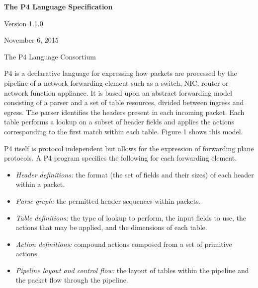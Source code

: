 \documentclass[12pt]{article}
\begin{document}
\vspace{2cm}

\centerline{\sffamily\bfseries\huge The P4 Language Specification}
\vspace{3mm}
\centerline{\sffamily\Large Version 1.1.0}
\vspace{3mm}
\centerline{\sffamily\large November 6, 2015}
\vspace{8mm}
\centerline{\sffamily\large The P4 Language Consortium}

\date{November 6, 2015}
\thispagestyle{firstpagestyle}


P4 is a declarative language for expressing how packets are processed by the 
pipeline of a network forwarding element such as a switch, NIC, router or 
network function appliance. It is based upon an abstract forwarding model 
consisting of a parser and a set of \matchaction table resources, divided 
between ingress and egress. The parser identifies the headers present in 
each incoming packet. Each \matchaction table performs a lookup on a subset 
of header fields and applies the actions corresponding to the first match 
within each table. Figure 1 shows this model.

P4 itself is protocol independent but allows for the expression of forwarding 
plane protocols. A P4 program specifies the following for each forwarding 
element.

\begin{itemize}
\item
\textit{Header definitions:} the format (the set of fields and their
sizes) of each header within a packet.
\item
\textit{Parse graph:} the permitted header sequences within packets.
\item
\textit{Table definitions:} the type of lookup to perform, the input
fields to use, the actions that may be applied, and the dimensions of
each table.
\item
\textit{Action definitions:} compound actions composed from a set of
primitive actions.
\item
\textit{Pipeline layout and control flow:} the layout of tables within
the pipeline and the packet flow through the pipeline.
\end{itemize}
\end{document}
